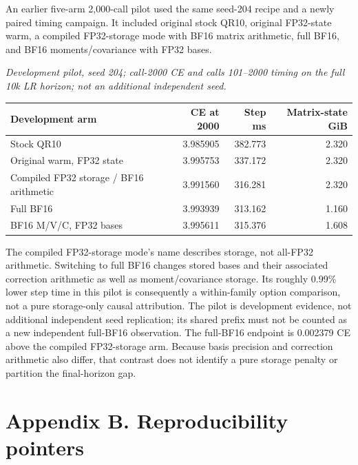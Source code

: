 \documentclass[
  10pt,
]{article}
\begin{document}
An earlier five-arm 2,000-call pilot used the same seed-204 recipe and a
newly paired timing campaign. It included original stock QR10, original
FP32-state warm, a compiled FP32-storage mode with BF16 matrix
arithmetic, full BF16, and BF16 moments/covariance with FP32 bases.

\begin{minipage}{\linewidth}

\emph{Development pilot, seed 204; call-2000 CE and calls 101--2000
timing on the full 10k LR horizon; not an additional independent seed.}

\begin{center}
\begin{tabular}{@{}lrrr@{}}
\toprule\noalign{}
Development arm & CE at 2000 & Step ms & Matrix-state GiB \\
\midrule\noalign{}
Stock QR10 & 3.985905 & 382.773 & 2.320 \\
Original warm, FP32 state & 3.995753 & 337.172 & 2.320 \\
Compiled FP32 storage / BF16 arithmetic & 3.991560 & 316.281 & 2.320 \\
Full BF16 & 3.993939 & 313.162 & 1.160 \\
BF16 M/V/C, FP32 bases & 3.995611 & 315.376 & 1.608 \\
\bottomrule
\end{tabular}
\end{center}

\end{minipage}

The compiled FP32-storage mode's name describes storage, not all-FP32
arithmetic. Switching to full BF16 changes stored bases and their
associated correction arithmetic as well as moment/covariance storage.
Its roughly 0.99\% lower step time in this pilot is consequently a
within-family option comparison, not a pure storage-only causal
attribution. The pilot is development evidence, not additional
independent seed replication; its shared prefix must not be counted as a
new independent full-BF16 observation. The full-BF16 endpoint is
0.002379 CE above the compiled FP32-storage arm. Because basis precision
and correction arithmetic also differ, that contrast does not identify a
pure storage penalty or partition the final-horizon gap.

\hypertarget{appendix-b.-reproducibility-pointers}{%
\section{Appendix B. Reproducibility
pointers}\label{appendix-b.-reproducibility-pointers}}
\end{document}
